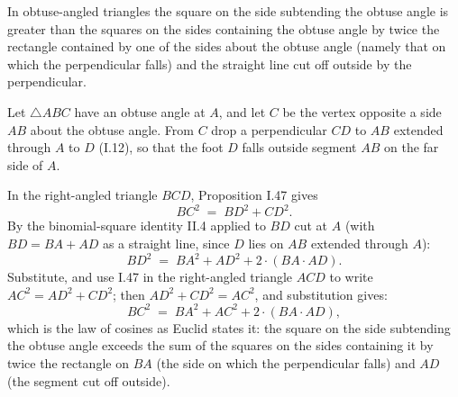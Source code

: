 \documentclass{rrxiv}
\begin{document}
\begin{claim}
\label{prop:II.12}
In obtuse-angled triangles the square on the side subtending the
obtuse angle is greater than the squares on the sides containing the
obtuse angle by twice the rectangle contained by one of the sides
about the obtuse angle (namely that on which the perpendicular falls)
and the straight line cut off outside by the perpendicular.
\end{claim}
\begin{evidence}[Proof of II.12]
\label{ev:II.12}
Let $\triangle ABC$ have an obtuse angle at $A$, and let $C$ be the
vertex opposite a side $AB$ about the obtuse angle.  From $C$ drop a
perpendicular $CD$ to $AB$ extended through $A$ to $D$ (I.12), so
that the foot $D$ falls outside segment $AB$ on the far side of $A$.

In the right-angled triangle $BCD$, Proposition I.47 gives
\[
    BC^2 \;=\; BD^2 + CD^2.
\]
By the binomial-square identity II.4 applied to $BD$ cut at $A$
(with $BD = BA + AD$ as a straight line, since $D$ lies on $AB$
extended through $A$):
\[
    BD^2 \;=\; BA^2 + AD^2 + 2\cdot(BA \cdot AD).
\]
Substitute, and use I.47 in the right-angled triangle $ACD$ to
write $AC^2 = AD^2 + CD^2$; then $AD^2 + CD^2 = AC^2$, and
substitution gives:
\[
    BC^2 \;=\; BA^2 + AC^2 + 2\cdot(BA \cdot AD),
\]
which is the law of cosines as Euclid states it: the square on the
side subtending the obtuse angle exceeds the sum of the squares on
the sides containing it by twice the rectangle on $BA$ (the side
on which the perpendicular falls) and $AD$ (the segment cut off
outside).
\end{evidence}
\end{document}

